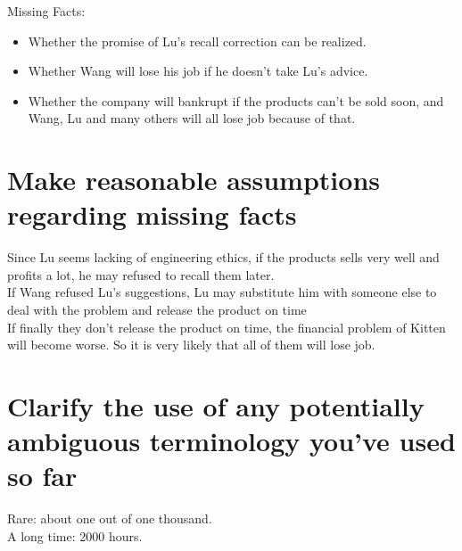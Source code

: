 \documentclass{article}
\begin{document}
Missing Facts:

\begin{itemize}
\item Whether the promise of Lu's recall correction can be realized.
\item Whether Wang will lose his job if he doesn't take Lu's advice.
\item Whether the company will bankrupt if the products can't be sold soon, and Wang, Lu and many others will all lose job because of that.
\end{itemize}

\section{Make reasonable assumptions regarding missing facts}

Since Lu seems lacking of engineering ethics, if the products sells very well and profits a lot, he may refused to recall them later. \\

If Wang refused Lu's suggestions, Lu may substitute him with someone else to deal with the problem and release the product on time \\

If finally they don't release the product on time, the financial problem of Kitten will become worse. So it is very likely that all of them will lose job.

\section{Clarify the use of any potentially ambiguous terminology you've used so far}

Rare: about one out of one thousand. \\

A long time: 2000 hours.
\end{document}
